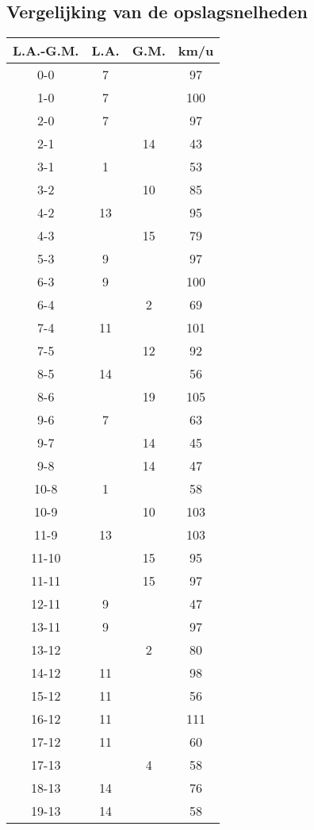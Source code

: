 \subsection{Vergelijking van de opslagsnelheden}
\label{sec:snelheden}

\begin{table}[h!]
  \centering
  \scriptsize
  \begin{tabular}{|c|c|c|c|} \hline
    L.A.-G.M. & L.A. & G.M. & km/u \\ \hline
    0-0 & 7 & & 97 \\
    1-0 & 7 & & 100 \\
    2-0 & 7 & & 97 \\
    2-1 & & 14 & 43 \\
    3-1 & 1 & & 53 \\
    3-2 & & 10 & 85 \\
    4-2 & 13 & & 95 \\
    4-3 & & 15 & 79 \\
    5-3 & 9 & & 97 \\
    6-3 & 9 & & 100 \\
    6-4 & & 2 & 69 \\
    7-4 & 11 & & 101 \\
    7-5 & & 12 & 92 \\
    8-5 & 14 & & 56 \\
    8-6 & & 19 & 105 \\
    9-6 & 7 & & 63 \\
    9-7 & & 14 & 45 \\
    9-8 & & 14 & 47 \\
    10-8 & 1 & & 58 \\
    10-9 & & 10 & 103 \\
    11-9 & 13 & & 103 \\
    11-10 & & 15 & 95 \\
    11-11 & & 15 & 97 \\
    12-11 & 9 & & 47 \\
    13-11 & 9 & & 97 \\
    13-12 & & 2 & 80 \\
    14-12 & 11 & & 98 \\
    15-12 & 11 & & 56 \\
    16-12 & 11 & & 111 \\
    17-12 & 11 & & 60 \\
    17-13 & & 4 & 58 \\
    18-13 & 14 & & 76 \\
    19-13 & 14 & & 58 \\

\end{tabular}
\end{table}
